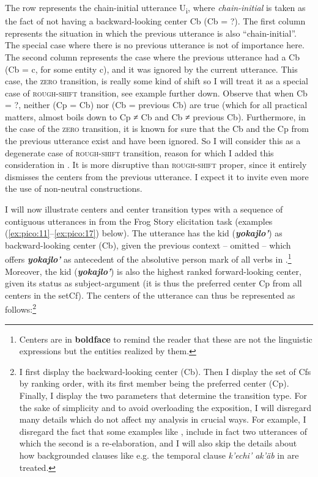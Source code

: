 \documentclass[output=paper
,modfonts
,nonflat]{langsci/langscibook}
\begin{document}
The row represents the chain-initial utterance U\textsubscript{i}, where \textit{chain-initial} is taken as the fact of not having a backward-looking center Cb (Cb = ?). The first column represents the situation in which the previous utterance is also ``chain-initial''. The special case where there is no previous utterance is not of importance here. The second column represents the case where the previous utterance had a Cb (Cb = c, for some entity c), and it was ignored by the current utterance. This case, the \textsc{zero} transition, is really some kind of shift so I will treat it as a special case of \textsc{rough-shift} transition, see example  further down. Observe that when Cb = ?, neither (Cp = Cb) nor (Cb = previous Cb) are true (which for all practical matters, almost boils down to Cp ≠ Cb and Cb ≠ previous Cb). Furthermore, in the case of the \textsc{zero} transition, it is known for sure that the Cb and the Cp from the previous utterance exist and have been ignored. So I will consider this as a degenerate case of \textsc{rough-shift} transition, reason for which I added this consideration in . It is more disruptive than \textsc{rough-shift} proper, since it entirely dismisses the centers from the previous utterance. I expect it to invite even more the use of non-neutral constructions.


I will now illustrate centers and center transition types with a sequence of contiguous utterances in  from the Frog Story elicitation task (examples (\ref{ex:pico:11}--\ref{ex:pico:17}) below). The utterance  has the kid (\textbf{\textit{yokajlo'}}) as backward-looking center (Cb), given the previous context -- omitted -- which offers \textbf{\textit{yokajlo'}} as antecedent of the absolutive person mark of all verbs in .\footnote{Centers are in \textbf{boldface} to remind the reader that these are not the linguistic expressions but the entities realized by them.} Moreover, the kid (\textbf{\textit{yokajlo'}}) is also the highest ranked forward-looking center, given its status as subject-argument (it is thus the preferred center Cp from all centers in the set\largerpage[2] Cf). The centers of the utterance  can thus be represented as follows:\footnote{I first display the backward-looking center (Cb). Then I display the set of Cfs by ranking order, with its first member being the preferred center (Cp). Finally, I display the two parameters that determine the transition type. For the sake of simplicity and to avoid overloading the exposition, I will disregard many details which do not affect my analysis in crucial ways. For example, I disregard the fact that some examples like , include in fact two utterances of which the second is a re-elaboration, and I will also skip the details about how backgrounded clauses like e.g. the temporal clause \textit{k'echi' ak'äb} in  are treated.}
\end{document}
